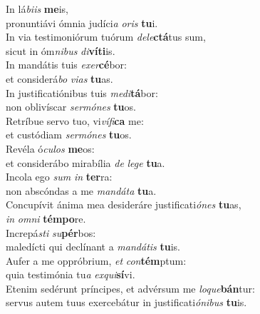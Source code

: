 \oddverse In lá\textit{bi}\textit{is} \textbf{me}is,~\*\\
\oddverse pronuntiávi ómnia judíci\textit{a} \textit{o}\textit{ris} \textbf{tu}i.\\
\evenverse In via testimoniórum tuórum \textit{de}\textit{le}\textbf{ctá}tus sum,~\*\\
\evenverse sicut in óm\textit{ni}\textit{bus} \textit{di}\textbf{ví}\textbf{ti}is.\\
\oddverse In mandátis tuis \textit{e}\textit{xer}\textbf{cé}bor:~\*\\
\oddverse et considerá\textit{bo} \textit{vi}\textit{as} \textbf{tu}as.\\
\evenverse In justificatiónibus tuis \textit{me}\textit{di}\textbf{tá}bor:~\*\\
\evenverse non oblivíscar \textit{ser}\textit{mó}\textit{nes} \textbf{tu}os.\\
\oddverse Retríbue servo tuo, vi\textit{ví}\textit{fi}\textbf{ca} me:~\*\\
\oddverse et custódiam \textit{ser}\textit{mó}\textit{nes} \textbf{tu}os.\\
\evenverse Revéla ó\textit{cu}\textit{los} \textbf{me}os:~\*\\
\evenverse et considerábo mirabília \textit{de} \textit{le}\textit{ge} \textbf{tu}a.\\
\oddverse Incola ego \textit{sum} \textit{in} \textbf{ter}ra:~\*\\
\oddverse non abscóndas a me \textit{man}\textit{dá}\textit{ta} \textbf{tu}a.\\
\evenverse Concupívit ánima mea desideráre justificati\textit{ó}\textit{nes} \textbf{tu}as,~\*\\
\evenverse \textit{in} \textit{om}\textit{ni} \textbf{tém}\textbf{po}re.\\
\oddverse Increpá\textit{sti} \textit{su}\textbf{pér}bos:~\*\\
\oddverse maledícti qui declínant a \textit{man}\textit{dá}\textit{tis} \textbf{tu}is.\\
\evenverse Aufer a me oppróbrium, \textit{et} \textit{con}\textbf{tém}ptum:~\*\\
\evenverse quia testimónia tu\textit{a} \textit{ex}\textit{qui}\textbf{sí}vi.\\
\oddverse Etenim sedérunt príncipes, et advérsum me \textit{lo}\textit{que}\textbf{bán}tur:~\*\\
\oddverse servus autem tuus exercebátur in justificati\textit{ó}\textit{ni}\textit{bus} \textbf{tu}is.\\
